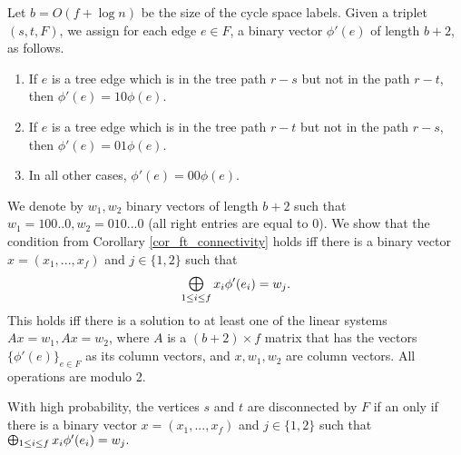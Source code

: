 Let $b = O(f + \log{n})$ be the size of the cycle space labels.
Given a triplet $(s,t,F)$, we assign for each edge $e \in F$, a binary vector $\phi'(e)$ of length $b+2$, as follows.
\begin{enumerate}
\item If $e$ is a tree edge which is in the tree path $r-s$ but not in the path $r-t$, then $\phi'(e)=10\phi(e)$.
\item If $e$ is a tree edge which is in the tree path $r-t$ but not in the path $r-s$, then $\phi'(e)=01\phi(e)$.
\item In all other cases, $\phi'(e)=00\phi(e).$ 
\end{enumerate}

We denote by $w_1,w_2$ binary vectors of length $b+2$ such that $w_1=100..0,w_2=010...0$ (all right entries are equal to 0).
We show that the condition from Corollary \ref{cor_ft_connectivity} holds iff there is a binary vector $x=(x_1,...,x_f)$ and $j \in \{1,2\}$ such that $$\Moplus_{1 \leq i \leq f} x_i \phi'(e_i) = w_j.$$ This holds iff there is a solution to at least one of the linear systems $Ax=w_1,Ax=w_2$, where $A$ is a $(b+2) \times f$ matrix that has the vectors $\{\phi'(e)\}_{e \in F}$ as its column vectors, and $x,w_1,w_2$ are column vectors. All operations are modulo 2.

\begin{lemma}
With high probability, the vertices $s$ and $t$ are disconnected by $F$ if an only if there is a binary vector $x=(x_1,...,x_f)$ and $j \in \{1,2\}$ such that $\Moplus_{1 \leq i \leq f} x_i \phi'(e_i)  = w_j.$
\end{lemma}

